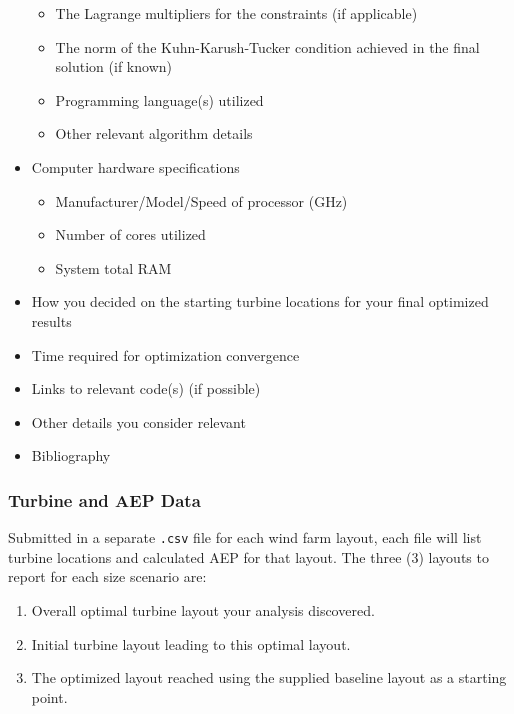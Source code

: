 \documentclass[12pt]{article}
\begin{document}
\begin{itemize}
\begin{itemize}
                    \item The Lagrange multipliers for the constraints (if applicable)
                    \item The norm of the Kuhn-Karush-Tucker condition achieved in the final solution (if known)
                    \item Programming language(s) utilized
                    \item Other relevant algorithm details
                \end{itemize}
                \item Computer hardware specifications
                \begin{itemize}
                    \item Manufacturer/Model/Speed of processor (GHz)
                    \item Number of cores utilized
                    \item System total RAM
                    \end{itemize}
                \item How you decided on the starting turbine locations for your final optimized results
                \item Time required for optimization convergence
                \item Links to relevant code(s) (if possible)
                \item Other details you consider relevant
                \item Bibliography
            \end{itemize}
    
    \subsubsection{Turbine and AEP Data}
        Submitted in a separate \texttt{.csv} file for each wind farm layout, each file will list turbine locations and calculated AEP for that layout. The three (3) layouts to report for each size scenario are:
    	
    	\begin{enumerate}
    	    \item Overall optimal turbine layout your analysis discovered.
    	    \item Initial turbine layout leading to this optimal layout.
    	    \item The optimized layout reached using the supplied baseline layout as a starting point.
    	\end{enumerate}
\end{document}
